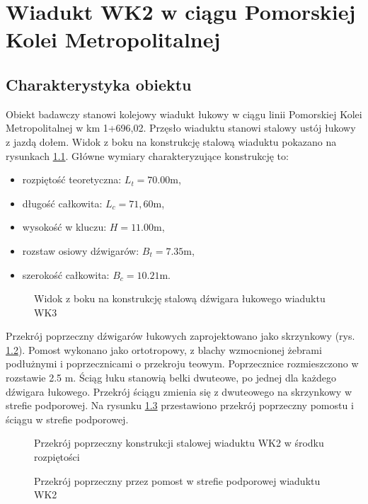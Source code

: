 \chapter{Wiadukt WK2 w ciągu Pomorskiej Kolei Metropolitalnej}

\section{Charakterystyka obiektu}
Obiekt badawczy stanowi kolejowy wiadukt łukowy w ciągu linii Pomorskiej Kolei Metropolitalnej w km 1+696,02. Przęsło wiaduktu stanowi stalowy ustój łukowy z jazdą dołem. Widok z boku na konstrukcję stalową wiaduktu pokazano na rysunkach \ref{fig: wk2_side_view}. Główne wymiary charakteryzujące konstrukcję to: 
\begin{itemize}[noitemsep]
	\item rozpiętość teoretyczna: $L_t=70.00 \text{m}$, 
	\item długość całkowita:  $L_c=71,60 \text{m}$, 
	\item wysokość w kluczu:  $H=11.00 \text{m}$,
	\item rozstaw osiowy dźwigarów: $B_t = 7.35 \text{m}$,
	\item szerokość całkowita: $B_c=10.21 \text{m}$. 
\end{itemize}
 \begin{figure}[h]
	\centering
	\captionsetup{justification=centering}
	\caption{Widok z boku na konstrukcję stalową dźwigara łukowego wiaduktu WK3}
	\label{fig: wk2_side_view}
\end{figure}

 Przekrój poprzeczny dźwigarów łukowych zaprojektowano jako skrzynkowy (rys. \ref{fig: wk2_cross_sect}). Pomost wykonano jako ortotropowy, z blachy wzmocnionej żebrami podłużnymi i poprzecznicami o przekroju teowym. Poprzecznice rozmieszczono w rozstawie 2.5 m. Ściąg łuku stanowią belki dwuteowe, po jednej dla każdego dźwigara łukowego. Przekrój ściągu zmienia się z dwuteowego na skrzynkowy w strefie podporowej. Na rysunku \ref{fig: wk2_cross_sect_deck} przestawiono przekrój poprzeczny pomostu i ściągu w strefie podporowej. 
  \begin{figure}[h]
 	\centering
 	\captionsetup{justification=centering}
 	\caption{Przekrój poprzeczny konstrukcji stalowej wiaduktu WK2 w środku rozpiętości}
 	\label{fig: wk2_cross_sect}
 \end{figure}
 \begin{figure}[h]
 	\centering
 	\captionsetup{justification=centering}
 	\caption{Przekrój poprzeczny przez pomost w strefie podporowej wiaduktu WK2}
 	\label{fig: wk2_cross_sect_deck}
 \end{figure}
 
